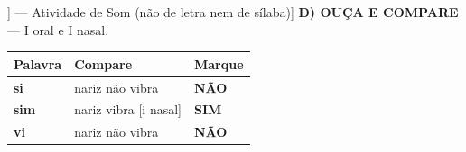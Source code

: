 \begin{exercicio}[Som /i/ [[i]] --- Atividade de Som (não de letra nem de sílaba)]
\textbf{D) OUÇA E COMPARE} --- I oral e I nasal.

\begin{center}
\begin{tabular}{@{}p{4.2cm}p{6.2cm}p{1.6cm}@{}}
\hline
\textbf{Palavra} & \textbf{Compare} & \textbf{Marque} \\
\hline
\textbf{si} & nariz não vibra & \textbf{NÃO} \\
\textbf{sim} & nariz vibra [i nasal] & \textbf{SIM} \\
\textbf{vi} & nariz não vibra & \textbf{NÃO} \\
\hline
\end{tabular}
\end{center}

\end{exercicio}

